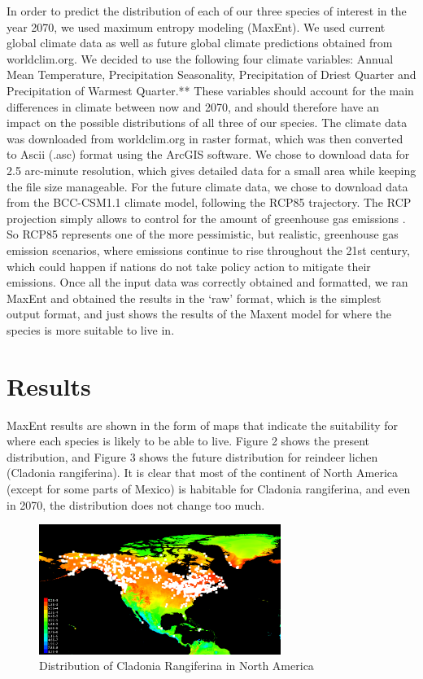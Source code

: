 \documentclass[twoside]{article}
\begin{document}
In order to predict the distribution of each of our three species of interest
in the year 2070, we used maximum entropy modeling (MaxEnt). We used current
global climate data as well as future global climate predictions obtained
from worldclim.org. We decided to use the following four climate variables:
Annual Mean Temperature, Precipitation Seasonality, Precipitation of Driest
Quarter and Precipitation of Warmest Quarter.** These variables should account
for the main differences in climate between now and 2070, and should therefore
have an impact on the possible distributions of all three of our species.
The climate data was downloaded from worldclim.org in raster format, which was
then converted to Ascii (.asc) format using the ArcGIS software. We chose to
download data for 2.5 arc-minute resolution, which gives detailed data for a
small area while keeping the file size manageable. For the future climate data,
we chose to download data from the BCC-CSM1.1 climate model, following the
RCP85 trajectory. The RCP projection simply allows to control for the amount
of greenhouse gas emissions \cite{ipcc}. So RCP85 represents one of the more
pessimistic, but realistic, greenhouse gas emission scenarios, where emissions
continue to rise throughout the 21st century, which could happen if nations
do not take policy action to mitigate their emissions. Once all the input data
was correctly obtained and formatted, we ran MaxEnt and obtained the results
in the ‘raw’ format, which is the simplest output format, and just shows the
results of the Maxent model for where the species is more suitable to live in.


\section{Results}
MaxEnt results are shown in the form of maps that indicate the suitability
for where each species is likely to be able to live. Figure 2 shows the
present distribution, and Figure 3 shows the future distribution for
reindeer lichen (Cladonia rangiferina). It is clear that most of the
continent of North America (except for some parts of Mexico) is habitable
for Cladonia rangiferina, and even in 2070, the distribution does not change
too much. \\
\begin{figure}[h!]
\centering
\includegraphics[width=0.7\textwidth]{NCladoniaPresent}
\caption{Distribution of Cladonia Rangiferina in North America}
\end{figure}
\end{document}
